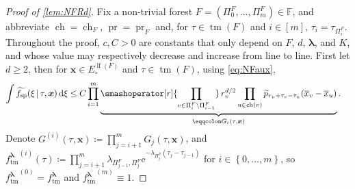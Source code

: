 \documentclass[reqno,draft]{amsart}
\numberwithin{equation}{section}
\theoremstyle{plain}
\theoremstyle{remark}
\newcommand*\diff{\mathop{}\!\mathrm{d}}
\newcommand{\e}{\mathrm{e}}
\DeclareMathOperator{\ch}{ch}
\DeclareMathOperator{\pr}{pr}
\newcommand{\fpart}{\Pi} %
\DeclareMathOperator{\lf}{lf}
\DeclareMathOperator{\nd}{nd}
\DeclareMathOperator{\dct}{tm}
\newcommand{\rfy}[1]{\widetilde{{#1}}} %
\newcommand{\ftm}{f_\mathrm{tm}^{\boldsymbol \lambda}}
\newcommand{\fsp}{f_\mathrm{sp}}
\newcommand{\interp}{\overline{x}} %
\begin{document}
\begin{proof}[Proof of \cref{lem:NFRd}]
    Fix a non-trivial forest $F=(\fpart^F_0, \ldots ,\fpart^F_m)\in \mathbb{F}$, and abbreviate $\ch = \ch_F$, $\pr = \pr_F$ and, for $\tau\in \dct(F)$ and $i\in [m]$, $\tau_i = \tau_{\fpart^F_i}$. Throughout the proof, $c,C > 0$ are constants that only depend on $F$, $d$, $\boldsymbol \lambda$, and $K$, and whose value may respectively decrease and increase from line to line. First let $d \ge 2$, then for $\boldsymbol x \in E^{\lf(F)}_\circ $ and $\tau\in \dct(F)$, using \cref{eq:NFaux},
    \begin{align}\label{eqprf:NFlem:4}
        \int \rfy{\fsp}(\xi \,\vert\,\tau,\boldsymbol x) \diff \xi
         &\le C \prod_{i=1}^m \underbrace{\smashoperator[r]{\prod_{v\in \fpart^F_i\setminus \fpart^F_{i-1}}}\, r_v^{d / 2} \prod_{u\in \ch(v)} \rfy{p}_{r_u+\tau_v-\tau_u}(\interp_v-\interp_u)}_{\eqqcolon G_i(\tau,\boldsymbol x)}.
    \end{align}
    Denote $G^{(i)}(\tau,\boldsymbol x) \coloneqq \prod_{j=i+1}^m G_j(\tau,\boldsymbol x)$, and ${\ftm}^{(i)}(\tau) \coloneqq \prod_{j=i+1}^{m} \lambda_{\fpart^F_{j-1},\fpart^F_j} \e^{-\lambda_{\fpart^F_j}(\tau_j-\tau_{j-1})}$ for $i\in \left\{ 0, \ldots ,m \right\} $, so ${\ftm}^{(0)}= \ftm$ and ${\ftm}^{(m)} \equiv 1$.


\end{proof}
\end{document}
